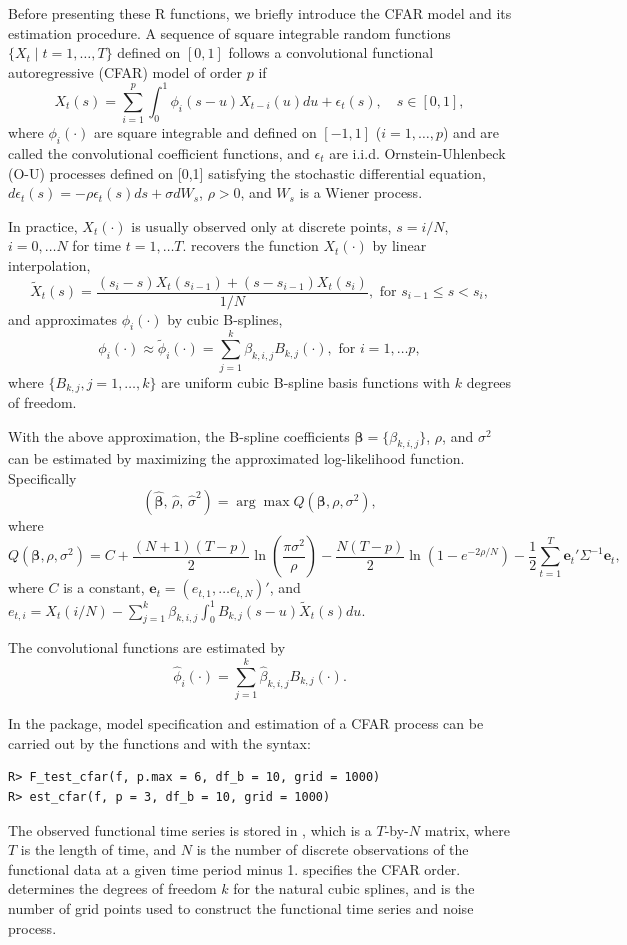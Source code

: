 Before presenting these {R} functions, we briefly introduce the CFAR model and its estimation procedure. A sequence of square integrable random functions $\{X_t\mid t=1,\ldots, T\}$ defined on $[0,1]$ follows a convolutional functional autoregressive (CFAR) model of order $p$ if
\[
X_t(s)=\sum_{i=1}^p \int_0^1 \phi_i(s-u)X_{t-i}(u)du +\epsilon_t(s), \quad s\in[0,1],
\]
where $\phi_i(\cdot)$ are square integrable and defined on $[-1,1]$ ($i=1,\ldots,p$) and are called the convolutional coefficient functions, and $\epsilon_t$ are i.i.d. Ornstein-Uhlenbeck (O-U) processes defined on [0,1] satisfying the stochastic differential equation, $d\epsilon_t(s)=-\rho \epsilon_t(s)ds+\sigma dW_s$, $\rho>0$, and $W_s$ is a Wiener process.

In practice, $X_t(\cdot)$ is usually observed only at discrete points, $s=i/N$, $i=0,\ldots N$ for time $t=1,\ldots T$. \cite{liu2016functional} recovers the function $X_t(\cdot)$ by linear interpolation,
\[
\widetilde{X}_t(s)=\frac{(s_i-s)X_t(s_{i-1})+(s-s_{i-1})X_t(s_i)}{1/N}, \mbox{ for } s_{i-1}\leq s< s_i,
\]
and approximates $\phi_i(\cdot)$ by cubic B-splines,
\[
\phi_i(\cdot) \approx \widetilde{\phi}_i(\cdot)=\sum_{j=1}^k {\beta}_{k,i,j}B_{k,j}(\cdot), \mbox{ for } i=1,\ldots p,
\]
where $\{B_{k,j},j=1,\ldots,k\}$ are uniform cubic B-spline basis functions with $k$ degrees of freedom.

With the above approximation, the B-spline coefficients $\boldsymbol{\beta}=\{{\beta}_{k,i,j}\}$, $\rho$, and $\sigma^2$ can be estimated by maximizing the approximated log-likelihood function. Specifically
\[
(\hat{{\boldsymbol{\beta}}},\, \hat{\rho},\, \hat{\sigma}^2)=\arg \max Q(\boldsymbol{\beta}, \rho,\sigma^2),
\]
where
\[
Q(\boldsymbol{\beta}, \rho,\sigma^2)=C+\frac{(N+1)(T-p)}{2}\ln \left(\frac{\pi \sigma^2}{\rho}\right)-\frac{N(T-p)}{2}\ln (1-e^{-2\rho/N}) -\frac{1}{2}\sum_{t=1}^T \mathbf{e}_t' \Sigma^{-1} \mathbf{e}_t,
\]
where $C$ is a constant, $\mathbf{e}_t=(e_{t,1},\ldots e_{t,N})'$, and $e_{t,i}=X_t(i/N)-\sum_{j=1}^k {\beta}_{k,i,j} \int_0^1 B_{k,j}(s-u) \widetilde{X}_t(s)du$.

The convolutional functions are estimated by
\[
\hat{\phi}_i(\cdot)=\sum_{j=1}^k \hat{\beta}_{k,i,j}B_{k,j}(\cdot).
\]

In the  package, model specification and estimation of a CFAR process can be carried out by the functions  and  with the syntax:
\begin{verbatim}
R> F_test_cfar(f, p.max = 6, df_b = 10, grid = 1000)
R> est_cfar(f, p = 3, df_b = 10, grid = 1000)
\end{verbatim}
The observed functional time series is stored in , which is a $T$-by-$N$ matrix, where $T$ is the length of time, and $N$ is the number of discrete observations of the functional data at a given time period minus 1.  specifies the CFAR order.   determines the degrees of freedom $k$ for
the natural cubic splines, and  is the number of grid points used to construct the functional time series and noise process.

